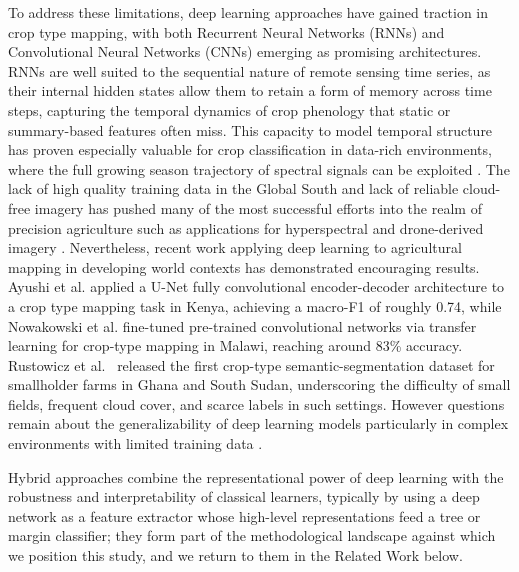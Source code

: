 \documentclass[pdflatex,sn-mathphys]{sn-jnl} %
\begin{document}
To address these limitations, deep learning approaches have gained traction in crop type mapping, with both Recurrent Neural Networks (RNNs) and Convolutional Neural Networks (CNNs) emerging as promising architectures. RNNs are well suited to the sequential nature of remote sensing time series, as their internal hidden states allow them to retain a form of memory across time steps, capturing the temporal dynamics of crop phenology that static or summary-based features often miss. This capacity to model temporal structure has proven especially valuable for crop classification in data-rich environments, where the full growing season trajectory of spectral signals can be exploited \cite{teixeira2023, zhu2017}. The lack of high quality training data in the Global South and lack of reliable cloud-free imagery has pushed many of the most successful efforts into the realm of precision agriculture such as applications for hyperspectral and drone-derived imagery \cite{mahlayeye2024}. Nevertheless, recent work applying deep learning to agricultural mapping in developing world contexts has demonstrated encouraging results. Ayushi et al. \cite{buttar2024} applied a U-Net fully convolutional encoder-decoder architecture to a crop type mapping task in Kenya, achieving a macro-F1 of roughly 0.74, while Nowakowski et al. \cite{nowakowski2021} fine-tuned pre-trained convolutional networks via transfer learning for crop-type mapping in Malawi, reaching around 83\% accuracy. Rustowicz et al.\ \cite{rustowicz2019} released the first crop-type semantic-segmentation dataset for smallholder farms in Ghana and South Sudan, underscoring the difficulty of small fields, frequent cloud cover, and scarce labels in such settings. However questions remain about the generalizability of deep learning models particularly in complex environments with limited training data \cite{pankajakshan2025}. 

Hybrid approaches combine the representational power of deep learning with the robustness and interpretability of classical learners, typically by using a deep network as a feature extractor whose high-level representations feed a tree or margin classifier; they form part of the methodological landscape against which we position this study, and we return to them in the Related Work below.
 
\end{document}
